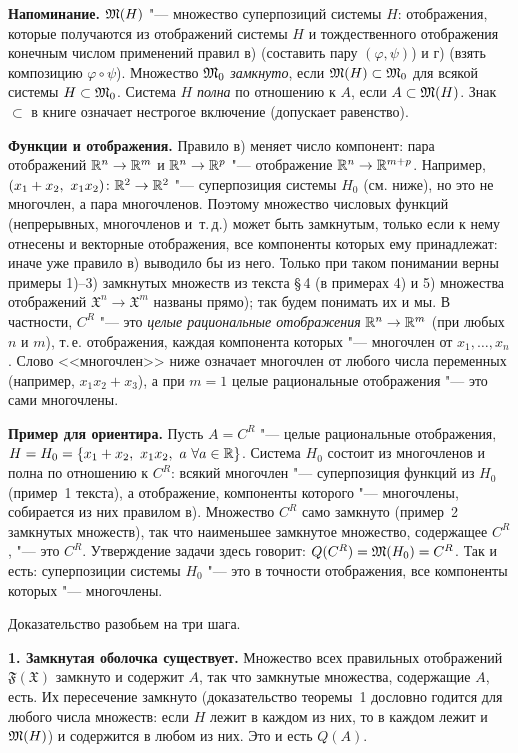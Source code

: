 \begin{solution}[4 (\S\,4)]
\textbf{Напоминание.} $\mathfrak M(H)$ "--- множество суперпозиций системы $H$:
отображения, которые получаются из отображений системы $H$ и
тождественного отображения конечным числом применений правил в) (составить
пару $(\varphi,\psi)$) и г) (взять композицию $\varphi\circ\psi$). Множество
$\mathfrak M_0$ \emph{замкнуто}, если $\mathfrak M(H)\subset\mathfrak M_0$ для всякой системы
$H\subset\mathfrak M_0$. Система $H$ \emph{полна} по отношению к $A$, если
$A\subset\mathfrak M(H)$. Знак $\subset$ в книге означает нестрогое включение
(допускает равенство).

\textbf{Функции и отображения.} Правило в) меняет число компонент: пара
отображений $\mathbb R^n\to\mathbb R^m$ и $\mathbb R^n\to\mathbb R^p$ "--- отображение $\mathbb R^n\to\mathbb R^{m+p}$.
Например, $(x_1+x_2,\ x_1x_2)\colon\mathbb R^2\to\mathbb R^2$ "--- суперпозиция системы
$H_0$ (см. ниже), но это не многочлен, а пара многочленов. Поэтому множество
числовых функций (непрерывных, многочленов и~т.\,д.) может быть замкнутым,
только если к нему отнесены и векторные отображения, все компоненты которых
ему принадлежат: иначе уже правило в) выводило бы из него. Только при таком
понимании верны примеры 1)--3) замкнутых множеств из текста \S\,4 (в
примерах 4) и 5) множества отображений $\mathfrak X^n\to\mathfrak X^m$ названы
прямо); так будем понимать их и мы. В частности, $C^R$ "--- это \emph{целые
рациональные отображения} $\mathbb R^n\to\mathbb R^m$ (при любых $n$ и $m$), т.\,е.
отображения, каждая компонента которых "--- многочлен от $x_1,\dots,x_n$.
Слово <<многочлен>> ниже означает многочлен от любого числа переменных
(например, $x_1x_2+x_3$), а при $m=1$ целые рациональные отображения "---
это сами многочлены.

\textbf{Пример для ориентира.} Пусть $A=C^R$ "--- целые рациональные
отображения, $H=H_0=\{x_1+x_2,\ x_1x_2,\ a\ \forall a\in\mathbb R\}$. Система $H_0$
состоит из многочленов и полна по отношению к $C^R$: всякий многочлен "---
суперпозиция функций из $H_0$ (пример~1 текста), а отображение, компоненты
которого "--- многочлены, собирается из них правилом в). Множество $C^R$ само
замкнуто (пример~2 замкнутых множеств), так что наименьшее замкнутое
множество, содержащее $C^R$, "--- это $C^R$. Утверждение задачи здесь
говорит: $Q(C^R)=\mathfrak M(H_0)=C^R$. Так и есть: суперпозиции системы $H_0$ "---
это в точности отображения, все компоненты которых "--- многочлены.

Доказательство разобьем на три шага.

\textbf{1. Замкнутая оболочка существует.} Множество всех правильных
отображений $\mathfrak F(\mathfrak X)$ замкнуто и содержит $A$, так что
замкнутые множества, содержащие $A$, есть. Их пересечение замкнуто
(доказательство теоремы~1 дословно годится для любого числа множеств: если
$H$ лежит в каждом из них, то в каждом лежит и $\mathfrak M(H)$) и содержится в
любом из них. Это и есть $Q(A)$.


\end{solution}
